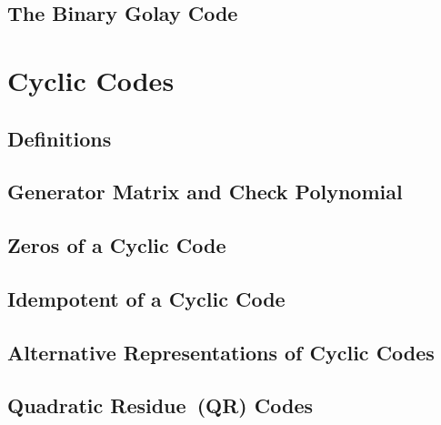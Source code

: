 \documentclass{article}
\renewcommand{\=}{\equiv}
\begin{document}
\subsection{The Binary Golay Code}

\section{Cyclic Codes}

\subsection{Definitions}

\subsection{Generator Matrix and Check Polynomial}

\subsection{Zeros of a Cyclic Code}

\subsection{Idempotent of a Cyclic Code}

\subsection{Alternative Representations of Cyclic Codes}

\subsection{Quadratic Residue (QR) Codes}
\end{document}
